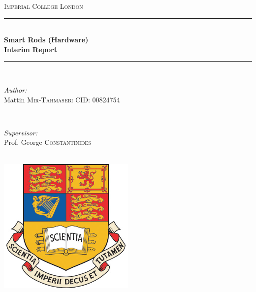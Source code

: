 \documentclass[12pt]{report}
\begin{document}
\begin{titlepage}

\newcommand{\HRule}{\rule{\linewidth}{0.5mm}} %

\center %
 


\textsc{\LARGE Imperial College London}\\[1.5cm] %





\HRule \\[0.4cm]
{ \huge \bfseries Smart Rods (Hardware) \\ Interim Report}\\[0.4cm] %
\HRule \\[1.5cm]
 



\begin{minipage}{0.4\textwidth}
\begin{flushleft} \large
\emph{Author:}\\
Mattin \textsc{Mir-Tahmasebi} %
CID: 00824754
\end{flushleft}
\end{minipage}
~
\begin{minipage}{0.4\textwidth}
\begin{flushright} \large
\emph{Supervisor:} \\
Prof. George \textsc{Constantinides} %
\end{flushright}
\end{minipage}\\[2cm]






\includegraphics[width=0.5\textwidth]{ImperialCrest.jpg}\\[1cm] %
 

\end{titlepage}
\end{document}
